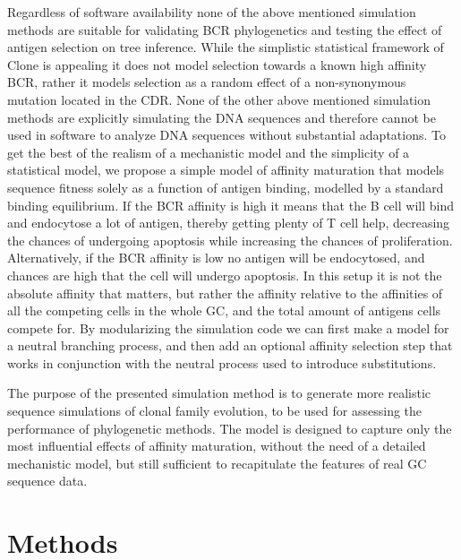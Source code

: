 Regardless of software availability none of the above mentioned simulation methods are suitable for validating BCR phylogenetics and testing the effect of antigen selection on tree inference.
While the simplistic statistical framework of Clone is appealing it does not model selection towards a known high affinity BCR, rather it models selection as a random effect of a non-synonymous mutation located in the CDR.
None of the other above mentioned simulation methods are explicitly simulating the DNA sequences and therefore cannot be used in software to analyze DNA sequences without substantial adaptations.
To get the best of the realism of a mechanistic model and the simplicity of a statistical model, we propose a simple model of affinity maturation that models sequence fitness solely as a function of antigen binding, modelled by a standard binding equilibrium.
If the BCR affinity is high it means that the B cell will bind and endocytose a lot of antigen, thereby getting plenty of T cell help, decreasing the chances of undergoing apoptosis while increasing the chances of proliferation.
Alternatively, if the BCR affinity is low no antigen will be endocytosed, and chances are high that the cell will undergo apoptosis.
In this setup it is not the absolute affinity that matters, but rather the affinity relative to the affinities of all the competing cells in the whole GC, and the total amount of antigens cells compete for.
By modularizing the simulation code we can first make a model for a neutral branching process, and then add an optional affinity selection step that works in conjunction with the neutral process used to introduce substitutions.

The purpose of the presented simulation method is to generate more realistic sequence simulations of clonal family evolution, to be used for assessing the performance of phylogenetic methods.
The model is designed to capture only the most influential effects of affinity maturation, without the need of a detailed mechanistic model, but still sufficient to recapitulate the features of real GC sequence data.






\section{Methods}

